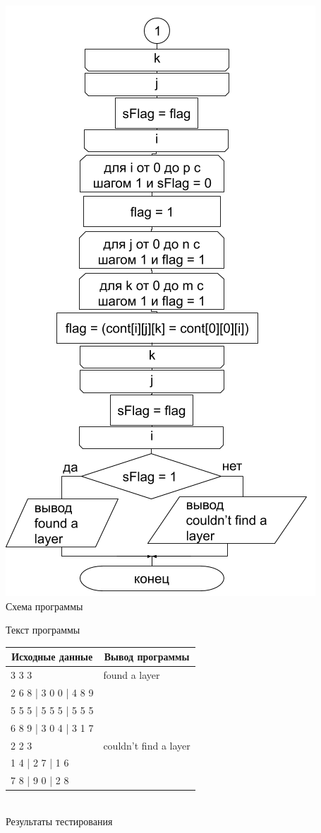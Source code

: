 \documentclass[a4paper,14pt]{extarticle}
\begin{document}
\begin{center}
\includegraphics[scale=0.6]{lab4-5-2.png}\\
Схема программы
\end{center}

\begin{center}
Текст программы\\
\vspace{0.6cm}
\begin{tabular}{|l|l|}
\hline
\multicolumn{1}{|c|}{Исходные данные}& \multicolumn{1}{|c|}{Вывод программы}\\
\hline
3 3 3 & found a layer \\
2 6 8 | 3 0 0 | 4 8 9 & \\
5 5 5 | 5 5 5 | 5 5 5 & \\
6 8 9 | 3 0 4 | 3 1 7 & \\
\hline
2 2 3 & couldn't find a layer \\
1 4 | 2 7 | 1 6 & \\
7 8 | 9 0 | 2 8 & \\
\hline
\end{tabular}\\
\vspace{0.3cm}
Результаты тестирования
\end{center}
\end{document}
